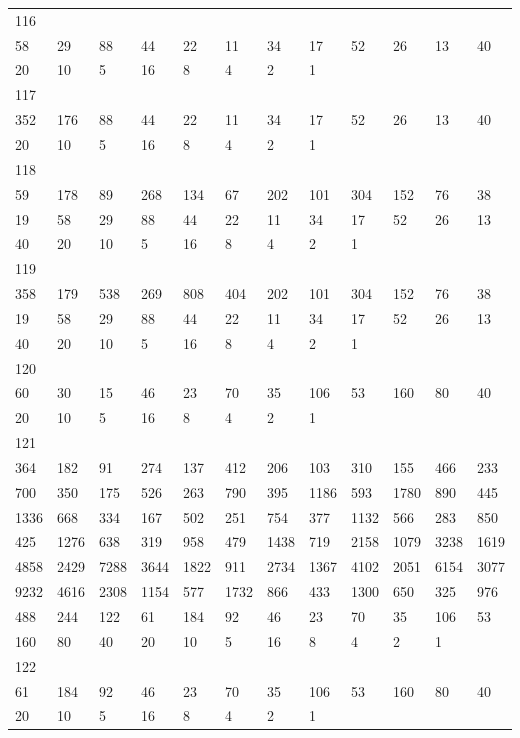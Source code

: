 \begin{longtable}{llllllllllll}
116&&&&&&&&&&&\\
58& 29& 88& 44& 22& 11& 34& 17& 52& 26& 13& 40\\
20& 10& 5& 16& 8& 4& 2& 1& \\

117&&&&&&&&&&&\\
352& 176& 88& 44& 22& 11& 34& 17& 52& 26& 13& 40\\
20& 10& 5& 16& 8& 4& 2& 1& \\

118&&&&&&&&&&&\\
59& 178& 89& 268& 134& 67& 202& 101& 304& 152& 76& 38\\
19& 58& 29& 88& 44& 22& 11& 34& 17& 52& 26& 13\\
40& 20& 10& 5& 16& 8& 4& 2& 1& \\

119&&&&&&&&&&&\\
358& 179& 538& 269& 808& 404& 202& 101& 304& 152& 76& 38\\
19& 58& 29& 88& 44& 22& 11& 34& 17& 52& 26& 13\\
40& 20& 10& 5& 16& 8& 4& 2& 1& \\

120&&&&&&&&&&&\\
60& 30& 15& 46& 23& 70& 35& 106& 53& 160& 80& 40\\
20& 10& 5& 16& 8& 4& 2& 1& \\

121&&&&&&&&&&&\\
364& 182& 91& 274& 137& 412& 206& 103& 310& 155& 466& 233\\
700& 350& 175& 526& 263& 790& 395& 1186& 593& 1780& 890& 445\\
1336& 668& 334& 167& 502& 251& 754& 377& 1132& 566& 283& 850\\
425& 1276& 638& 319& 958& 479& 1438& 719& 2158& 1079& 3238& 1619\\
4858& 2429& 7288& 3644& 1822& 911& 2734& 1367& 4102& 2051& 6154& 3077\\
9232& 4616& 2308& 1154& 577& 1732& 866& 433& 1300& 650& 325& 976\\
488& 244& 122& 61& 184& 92& 46& 23& 70& 35& 106& 53\\
160& 80& 40& 20& 10& 5& 16& 8& 4& 2& 1& \\

122&&&&&&&&&&&\\
61& 184& 92& 46& 23& 70& 35& 106& 53& 160& 80& 40\\
20& 10& 5& 16& 8& 4& 2& 1& \\


\end{longtable}
